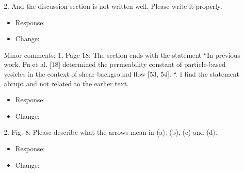 \documentclass[11pt]{article}
\newcommand{\comment}[1]{{\color{blue} #1}}
\begin{document}
\noindent
\comment{2. And the discussion section is not written well. Please write it
properly.}

\begin{itemize}
  \item Response:  
  
  \item Change: 
  
\end{itemize}


\noindent
\comment{Minor comments: 1. Page 18: The section ends with 
the statement “In previous work, Fu
et al. [18] determined the permeability constant of particle-based
vesicles in the context of shear background flow [53, 54]. “. I find
the statement abrupt and not related to the earlier text.}

\begin{itemize}
  \item Response: 
  
\item Change: 


\end{itemize}

\noindent
\comment{2. Fig. 8: Please describe what the arrows mean in (a), (b), (c) and
(d).}

\begin{itemize}
  \item Response: 
  
  \item Change:
  
\end{itemize}
\end{document}
